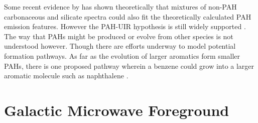 Some recent evidence by \cite{zhang14} has shown theoretically that mixtures of non-PAH carbonaceous and silicate spectra could also fit the theoretically calculated PAH emission features. However the PAH-UIR hypothesis is still widely supported \citep{tielens08,rastogi13}. The way that PAHs might be produced or evolve from other species is not understood however. Though there are efforts underway to model potential formation pathways. As far as the evolution of larger aromatics form smaller PAHs, there is one proposed pathway wherein a benzene could grow into a larger aromatic molecule such as naphthalene \citep{ghesquiere14}.

\section{Galactic Microwave Foreground}

